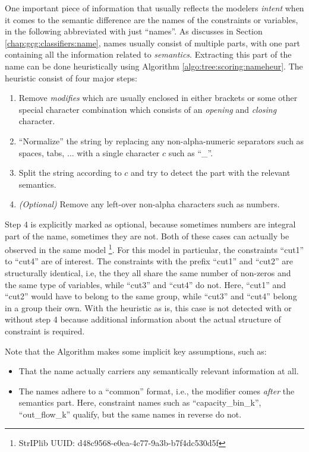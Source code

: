 			One important piece of information that usually reflects the modelers \textit{intent} when it comes to the semantic difference are the names of the constraints or variables, in the following abbreviated with just \enquote{names}.
			As discusses in Section \ref{chap:gcg:classifiers:name}, names usually consist of multiple parts, with one part containing all the information related to \textit{semantics}.
			Extracting this part of the name can be done heuristically using Algorithm \ref{algo:tree:scoring:nameheur}.
			The heuristic consist of four major steps:
			\begin{enumerate}
				\item Remove \textit{modifies} which are usually enclosed in either brackets or some other special character combination which consists of an \textit{opening} and \textit{closing} character.
				\item \enquote{Normalize} the string by replacing any non-alpha-numeric separators such as spaces, tabs, $\ldots$ with a single character $c$ such as \enquote{\_}.
				\item Split the string according to $c$ and try to detect the part with the relevant semantics. 
				\item \textit{(Optional)} Remove any left-over non-alpha characters such as numbers.
			\end{enumerate}
			
			Step 4 is explicitly marked as optional, because sometimes numbers are integral part of the name, sometimes they are not.
			Both of these cases can actually be observed in the same model \footnote{StrIPlib UUID: d48c9568-e0ea-4c77-9a3b-b7f4dc530d5f}.
			For this model in particular, the constraints \enquote{cut1} to \enquote{cut4} are of interest.
			The constraints with the prefix \enquote{cut1} and \enquote{cut2} are structurally identical, i.e, the they all share the same number of non-zeros and the same type of variables, while \enquote{cut3} and \enquote{cut4} do not.
			Here, \enquote{cut1} and \enquote{cut2} would have to belong to the same group, while \enquote{cut3} and \enquote{cut4} belong in a group their own.
			With the heuristic as is, this case is not detected with or without step 4 because additional information about the actual structure of constraint is required.
			
			Note that the Algorithm makes some implicit key assumptions, such as:
			\begin{itemize}
				\item That the name actually carriers any semantically relevant information at all.
				\item The names adhere to a \enquote{common} format, i.e., the modifier comes \textit{after} the semantics part. Here, constraint names such as \enquote{capacity\_bin\_k}, \enquote{out\_flow\_k} qualify, but the same names in reverse do not.
			\end{itemize}
			
